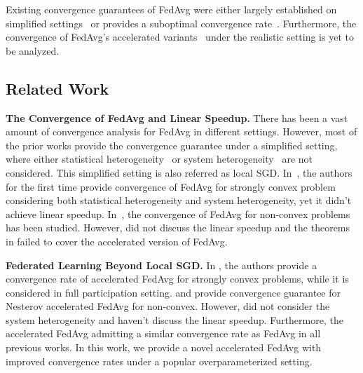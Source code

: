 Existing convergence guarantees of FedAvg were either largely established on simplified settings~\cite{stich2018local,khaled2019first,wang2018cooperative,yu2019parallel} or provides a suboptimal 
convergence rate~\cite{li2019convergence}. Furthermore, the convergence of
FedAvg's accelerated variants~\cite{yu2019linear,huo2020faster,liu2019accelerating} under the realistic setting is yet to be analyzed.

\subsection{Related Work}
\textbf{The Convergence of FedAvg and Linear Speedup.}
There has been a vast amount of convergence analysis for FedAvg in different settings. However, most of the prior works provide the
convergence guarantee under a simplified setting, where either statistical
heterogeneity~\cite{stich2018local,zhou2017convergence,wang2018cooperative,woodworth2018graph} or system
heterogeneity~\cite{yu2019parallel,wang2019adaptive,khaled2019first,jiang2018linear} are not
considered. This simplified setting is also referred as local SGD. 
In~\cite{li2019convergence},
the authors for the first time provide convergence of FedAvg for strongly convex problem considering both statistical heterogeneity and system heterogeneity, yet it
didn't achieve linear speedup. In~\cite{haddadpour2019convergence,liang2019variance,huo2020faster,jiang2018linear}, the convergence of FedAvg for non-convex problems has been studied. 
However, \cite{huo2020faster} did not discuss the linear speedup and the theorems in \cite{haddadpour2019convergence,liang2019variance} failed to cover the accelerated version of
FedAvg. 


\textbf{Federated Learning Beyond Local SGD.}
In \cite{liu2019accelerating}, the authors provide a convergence rate of accelerated FedAvg for strongly convex problems, while it is considered in full participation setting.
\cite{yu2019linear} and \citep{huo2020faster} provide
convergence guarantee for Nesterov accelerated FedAvg for non-convex. 
However, \cite{yu2019linear} did not consider the system heterogeneity and \cite{huo2020faster} haven't discuss the linear speedup.
Furthermore, the accelerated FedAvg admitting a similar convergence rate as FedAvg in all previous works.  In this work, we provide a novel accelerated FedAvg with improved convergence rates under a popular overparameterized setting. 








